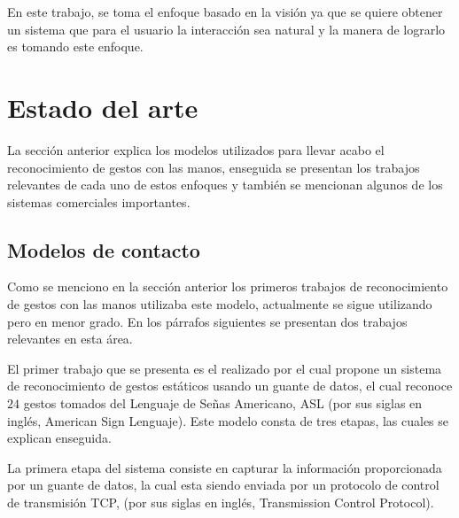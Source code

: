  


En este trabajo, se toma el enfoque basado en la visión ya que se quiere obtener un sistema que para el usuario la interacción sea natural y la manera de lograrlo es tomando este enfoque.  



\section{Estado del arte}\label{sec:EstadoDelArte} 

La sección anterior explica los modelos utilizados para llevar acabo el reconocimiento de gestos con las manos, enseguida se presentan los trabajos relevantes de cada uno de estos enfoques y también se mencionan algunos de los sistemas comerciales importantes. 

\subsection{Modelos de contacto}
 
Como se menciono en la sección anterior los primeros trabajos de reconocimiento de gestos con las manos utilizaba este modelo, actualmente se sigue utilizando pero en menor grado. En los párrafos siguientes se presentan dos trabajos relevantes en esta área. 

El primer trabajo que se presenta es el realizado por \citep{Yoon2012} el cual propone un sistema de reconocimiento de gestos estáticos usando un guante de datos, el cual reconoce $24$ gestos tomados del Lenguaje de Señas Americano, ASL (por sus siglas en inglés, American Sign Lenguaje). Este modelo consta de tres etapas, las cuales se explican enseguida. 

La primera etapa del sistema consiste en capturar la información proporcionada por un guante de datos, la cual esta siendo enviada por un protocolo de control de transmisión TCP, (por sus siglas en inglés, Transmission Control Protocol). 
 
